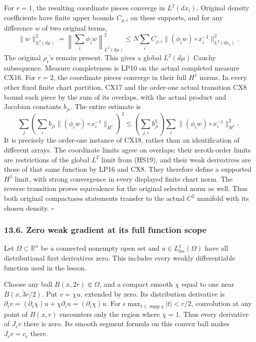\documentclass[
  11pt,
]{article}
\begin{document}
For \(r=1\), the resulting coordinate pieces converge in \(L^2(dx_i)\).
Original density coefficients have finite upper bounds \(C_{\rho,i}\) on
these supports, and for any difference \(w\) of two original terms, \[
 \|w\|_{L^2(d\mu)}^2
   =\left\|\sum_i\phi_i w\right\|_{L^2(d\mu)}^2
   \leq N\sum_i C_{\rho,i}
               \|(\phi_i w)\circ x_i^{-1}\|_{L^2(dx_i)}^2 .
                                                               \tag{HS19}
\] The original \(\rho_i\)'s remain present. This gives a global
\(L^2(d\mu)\) Cauchy subsequence. Measure completeness is LP10 on the
actual completed measure CX16. For \(r=2\), the coordinate pieces
converge in their full \(H^1\) norms. In every other fixed finite chart
partition, CX17 and the order-one actual transition CX8 bound each piece
by the sum of its overlaps, with the actual product and Jacobian
constants \(b_{ji}\). The entire estimate is \[
 \sum_j\left(\sum_i b_{ji}
       \|(\phi_i w)\circ x_i^{-1}\|_{H^1}\right)^2
 \leq \left(\sum_{j,i}b_{ji}^2\right)
         \sum_i\|(\phi_i w)\circ x_i^{-1}\|_{H^1}^2 .             \tag{HS20}
\] It is precisely the order-one instance of CX18, rather than an
identification of different arrays. The coordinate limits agree on
overlaps: their zeroth-order limits are restrictions of the global
\(L^2\) limit from (HS19), and their weak derivatives are those of that
same function by LP16 and CX8. They therefore define a supported \(H^1\)
limit, with strong convergence in every displayed finite chart norm. The
reverse transition proves equivalence for the original selected norm as
well. Thus both original compactness statements transfer to the actual
\(C^2\) manifold with its chosen density. \(\square\)

\subsubsection{13.6. Zero weak gradient at its full function
scope}\label{zero-weak-gradient-at-its-full-function-scope}

Let \(\Omega\subset\mathbb R^n\) be a connected nonempty open set and
\(u\in L^1_{\mathrm{loc}}(\Omega)\) have all distributional first
derivatives zero. This includes every weakly differentiable function
used in the lesson.

Choose any ball \(B(x,2r)\Subset\Omega\), and a compact smooth \(\chi\)
equal to one near \(\overline{B(x,3r/2)}\). Put \(v=\chi u\), extended
by zero. Its distribution derivative is
\(\partial_i v=(\partial_i\chi)u+\chi\partial_i u=(\partial_i\chi)u\).
For \(\epsilon\max_{t\in\operatorname{supp}\eta}|t|<r/2\), convolution
at any point of \(B(x,r)\) encounters only the region where \(\chi=1\).
Thus every derivative of \(J_\epsilon v\) there is zero. Its smooth
segment formula on this convex ball makes \(J_\epsilon v=c_\epsilon\)
there.
\end{document}
